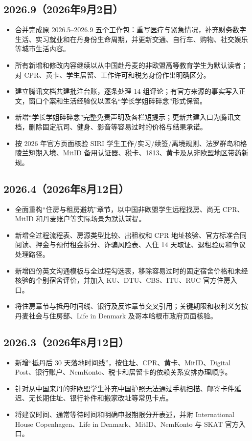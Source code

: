 \subsection*{2026.9（2026年9月2日）}
\begin{itemize}
  \item 合并完成原 2026.5--2026.9 五个工作包：重写医疗与紧急情况，补充财务数字生活、实习就业和在丹身份生命周期，并更新交通、自行车、购物、社交娱乐等城市生活内容。
  \item 所有新增和修改内容继续以从中国赴丹麦的非欧盟高等教育学生为默认读者；对 CPR、黄卡、学生居留、工作许可和税务身份作出明确区分。
  \item 建立腾讯文档共建批注台账，逐条处理 14 组评论；有官方来源的事实写入正文，窗口个案和生活经验仅以匿名“学长学姐碎碎念”形式保留。
  \item 新增“学长学姐碎碎念”完整免责声明及各栏短提示；更新共建入口为腾讯文档，删除固定航司、健身、影音等容易过时的价格与结果承诺。
  \item 按 2026 年官方页面核验 SIRI 学生工作/实习/续签/离境规则、法罗群岛和格陵兰短期入境、MitID 备用认证器、税卡、1813、黄卡及从非欧盟地区带药新规。
\end{itemize}

\subsection*{2026.4（2026年8月12日）}
\begin{itemize}
  \item 全面重构“住房与租房避坑”章节，以中国非欧盟学生远程找房、尚无 CPR、MitID 和丹麦账户等实际场景为默认前提。
  \item 新增全过程流程表、房源类型比较、出租权和 CPR 地址核验、官方标准合同阅读、押金与预付租金拆分、诈骗风险表、入住 14 天取证、退租验房和争议处理路径。
  \item 新增四份英文沟通模板与全过程勾选表，移除容易过时的固定宿舍价格和未经核验的个别宿舍评价，并加入 KU、DTU、CBS、ITU、RUC 官方住房入口。
  \item 将住房章节与抵丹时间线、银行及反诈章节交叉引用；关键期限和权利义务按丹麦社会与住房部、Life in Denmark 及哥本哈根市政府页面核验。
\end{itemize}

\subsection*{2026.3（2026年8月12日）}
\begin{itemize}
  \item 新增“抵丹后 30 天落地时间线”，按住址、CPR、黄卡、MitID、Digital Post、银行账户、NemKonto、税卡和居留卡的依赖关系安排办理顺序。
  \item 针对从中国来丹的非欧盟学生补充中国护照无法通过手机扫描、邮寄卡件延迟、无长期住址、银行补件和搬家改址等常见卡点。
  \item 将建议时间、通常等待时间和明确申报期限分开表述，并附 International House Copenhagen、Life in Denmark、MitID、NemKonto 与 SKAT 官方入口。
\end{itemize}

